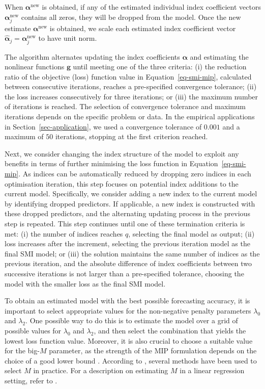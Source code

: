 \documentclass[
  11pt,
  a4paper,
]{article}
\begin{document}
When \(\bm{\alpha}^{\text{new}}\) is obtained, if any of the estimated
individual index coefficient vectors \(\bm{\alpha}_{j}^{\text{new}}\)
contains all zeros, they will be dropped from the model. Once the new
estimate \(\bm{\alpha}^{\text{new}}\) is obtained, we scale each
estimated index coefficient vector
\(\hat{\bm{\alpha}}_{j} = \bm{\alpha}_{j}^{\text{new}}\) to have unit
norm.

The algorithm alternates updating the index coefficients \(\bm{\alpha}\)
and estimating the nonlinear functions \(\bm{g}\) until meeting one of
the three criteria: (i) the reduction ratio of the objective (loss)
function value in Equation~\ref{eq-smi-mip}, calculated between
consecutive iterations, reaches a pre-specified convergence tolerance;
(ii) the loss increases consecutively for three iterations; or (iii) the
maximum number of iterations is reached. The selection of convergence
tolerance and maximum iterations depends on the specific problem or
data. In the empirical applications in Section~\ref{sec-application}, we
used a convergence tolerance of \(0.001\) and a maximum of \(50\)
iterations, stopping at the first criterion reached.

Next, we consider changing the index structure of the model to exploit
any benefits in terms of further minimising the loss function in
Equation~\ref{eq-smi-mip}. As indices can be automatically reduced by
dropping zero indices in each optimisation iteration, this step focuses
on potential index additions to the current model. Specifically, we
consider adding a new index to the current model by identifying dropped
predictors. If applicable, a new index is constructed with these dropped
predictors, and the alternating updating process in the previous step is
repeated. This step continues until one of these termination criteria is
met: (i) the number of indices reaches \(q\), selecting the final model
as output; (ii) loss increases after the increment, selecting the
previous iteration model as the final SMI model; or (iii) the solution
maintains the same number of indices as the previous iteration, and the
absolute difference of index coefficients between two successive
iterations is not larger than a pre-specified tolerance, choosing the
model with the smaller loss as the final SMI model.

To obtain an estimated model with the best possible forecasting
accuracy, it is important to select appropriate values for the
non-negative penalty parameters \(\lambda_{0}\) and \(\lambda_{2}\). One
possible way to do this is to estimate the model over a grid of possible
values for \(\lambda_{0}\) and \(\lambda_{2}\), and then select the
combination that yields the lowest loss function value. Moreover, it is
also crucial to choose a suitable value for the big-\(M\) parameter, as
the strength of the MIP formulation depends on the choice of a good
lower bound \autocite{Bertsimas2016}. According to
\textcite{Hazimeh2023}, several methods have been used to select \(M\)
in practice. For a description on estimating \(M\) in a linear
regression setting, refer to \textcite{Bertsimas2016}.
\end{document}
